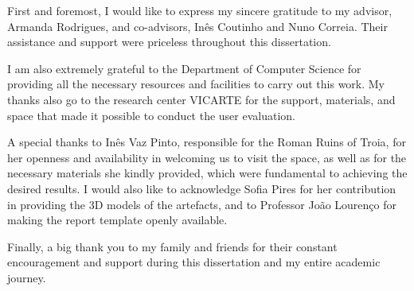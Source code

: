 
%

\begin{ntacknowledgements}

First and foremost, I would like to express my sincere gratitude to my advisor, Armanda Rodrigues, and co-advisors, Inês Coutinho and Nuno Correia. Their assistance and support were priceless throughout this dissertation.

I am also extremely grateful to the Department of Computer Science for providing all the necessary resources and facilities to carry out this work. My thanks also go to the research center VICARTE for the support, materials, and space that made it possible to conduct the user evaluation.

A special thanks to Inês Vaz Pinto, responsible for the Roman Ruins of Troia, for her openness and availability in welcoming us to visit the space, as well as for the necessary materials she kindly provided, which were fundamental to achieving the desired results.
I would also like to acknowledge Sofia Pires for her contribution in providing the 3D models of the artefacts, and to Professor João Lourenço for making the report template openly available.

Finally, a big thank you to my family and friends for their constant encouragement and support during this dissertation and my entire academic journey.

\end{ntacknowledgements}